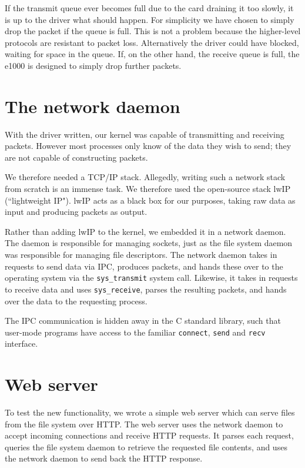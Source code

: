 \documentclass{report}
\begin{document}
If the transmit queue ever becomes full due to the card draining it too
slowly, it is up to the driver what should happen. For simplicity we have
chosen to simply drop the packet if the queue is full. This is not a problem
because the higher-level protocols are resistant to packet loss. Alternatively
the driver could have blocked, waiting for space in the queue. If, on the
other hand, the receive queue is full, the e1000 is designed to simply drop
further packets.


\section{The network daemon}
With the driver written, our kernel was capable of transmitting and receiving
packets. However most processes only know of the data they wish to send; they
are not capable of constructing packets.

We therefore needed a TCP/IP stack. Allegedly, writing such a network stack
from scratch is an immense task. We therefore used the open-source stack lwIP
(``lightweight IP"). lwIP acts as a black box for our purposes, taking raw data
as input and producing packets as output.

Rather than adding lwIP to the kernel, we embedded it in a network daemon. The
daemon is responsible for managing sockets, just as the file system daemon was
responsible for managing file descriptors. The network daemon takes in
requests to send data via IPC, produces packets, and hands these over to the
operating system via the \texttt{sys\_transmit} system call. Likewise, it
takes in requests to receive data and uses \texttt{sys\_receive}, parses the
resulting packets, and hands over the data to the requesting process.

The IPC communication is hidden away in the C standard library, such that
user-mode programs have access to the familiar \texttt{connect}, \texttt{send}
and \texttt{recv} interface.


\section{Web server}
To test the new functionality, we wrote a simple web server which can serve
files from the file system over HTTP. The web server uses the network daemon
to accept incoming connections and receive HTTP requests. It parses each
request, queries the file system daemon to retrieve the requested file
contents, and uses the network daemon to send back the HTTP response.
\end{document}
